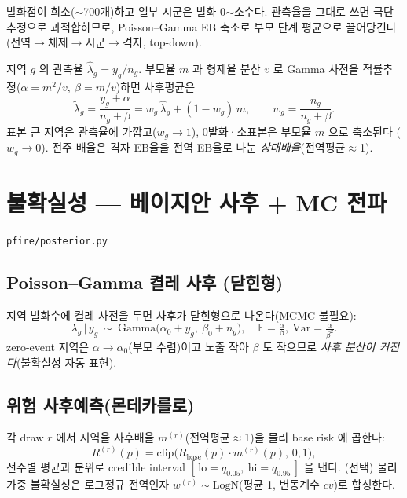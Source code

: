 \documentclass[11pt,a4paper]{article}
\newcommand{\src}[1]{{\footnotesize\color{gray}\texttt{#1}}}
\begin{document}
발화점이 희소($\sim$700개)하고 일부 시군은 발화 0$\sim$소수다. 관측율을 그대로 쓰면
극단 추정으로 과적합하므로, Poisson--Gamma EB 축소로 부모 단계 평균으로 끌어당긴다
(전역$\to$체제$\to$시군$\to$격자, top-down).

지역 $g$ 의 관측율 $\hat\lambda_g=y_g/n_g$. 부모율 $m$ 과 형제율 분산 $v$ 로 Gamma 사전을
적률추정($\alpha=m^2/v,\ \beta=m/v$)하면 사후평균은
\begin{equation}
\tilde\lambda_g=\frac{y_g+\alpha}{n_g+\beta}
=w_g\,\hat\lambda_g+(1-w_g)\,m,\qquad w_g=\frac{n_g}{n_g+\beta}.
\end{equation}
표본 큰 지역은 관측율에 가깝고($w_g\to1$), 0발화·소표본은 부모율 $m$ 으로 축소된다
($w_g\to0$). 전주 배율은 격자 EB율을 전역 EB율로 나눈 \emph{상대배율}(전역평균$\approx$1).

\section{불확실성 — 베이지안 사후 + MC 전파}
\src{pfire/posterior.py}

\subsection{Poisson--Gamma 켤레 사후 (닫힌형)}
지역 발화수에 켤레 사전을 두면 사후가 닫힌형으로 나온다(MCMC 불필요):
\begin{equation}
\lambda_g\,\big|\,y_g\ \sim\ \mathrm{Gamma}\!\big(\alpha_0+y_g,\ \beta_0+n_g\big),
\quad \mathbb{E}=\tfrac{\alpha}{\beta},\ \mathrm{Var}=\tfrac{\alpha}{\beta^2}.
\end{equation}
zero-event 지역은 $\alpha\!\to\!\alpha_0$(부모 수렴)이고 노출 작아 $\beta$ 도 작으므로
\emph{사후 분산이 커진다}(불확실성 자동 표현).

\subsection{위험 사후예측(몬테카를로)}
각 draw $r$ 에서 지역율 사후배율 $m^{(r)}$(전역평균$\approx$1)을 물리 base risk 에 곱한다:
\begin{equation}
R^{(r)}(p)=\mathrm{clip}\big(R_{\text{base}}(p)\cdot m^{(r)}(p),\,0,1\big),
\end{equation}
전주별 평균과 분위로 credible interval $[\,\mathrm{lo}=q_{0.05},\ \mathrm{hi}=q_{0.95}\,]$ 을 낸다.
(선택) 물리 가중 불확실성은 로그정규 전역인자 $w^{(r)}\!\sim\!\mathrm{LogN}$(평균 1, 변동계수
$cv$)로 합성한다.
\end{document}
